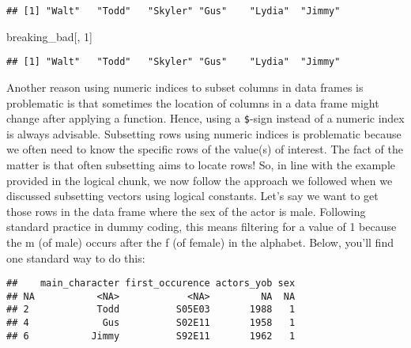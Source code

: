 \documentclass[
]{article}
\newenvironment{Shaded}{\begin{snugshade}}{\end{snugshade}}
\newcommand{\DecValTok}[1]{\textcolor[rgb]{0.00,0.00,0.81}{#1}}
\newcommand{\NormalTok}[1]{#1}
\newcommand{\SpecialCharTok}[1]{\textcolor[rgb]{0.00,0.00,0.00}{#1}}
\begin{document}
\begin{Shaded}
\end{Shaded}

\begin{verbatim}
## [1] "Walt"   "Todd"   "Skyler" "Gus"    "Lydia"  "Jimmy"
\end{verbatim}

\begin{Shaded}
\begin{Highlighting}[]
\NormalTok{breaking\_bad[, }\DecValTok{1}\NormalTok{]}
\end{Highlighting}
\end{Shaded}

\begin{verbatim}
## [1] "Walt"   "Todd"   "Skyler" "Gus"    "Lydia"  "Jimmy"
\end{verbatim}

Another reason using numeric indices to subset columns in data frames is
problematic is that sometimes the location of columns in a data frame
might change after applying a function. Hence, using a \texttt{\$}-sign
instead of a numeric index is always advisable. Subsetting rows using
numeric indices is problematic because we often need to know the
specific rows of the value(s) of interest. The fact of the matter is
that often subsetting aims to locate rows! So, in line with the example
provided in the logical chunk, we now follow the approach we followed
when we discussed subsetting vectors using logical constants. Let's say
we want to get those rows in the data frame where the sex of the actor
is male. Following standard practice in dummy coding, this means
filtering for a value of 1 because the m (of male) occurs after the f
(of female) in the alphabet. Below, you'll find one standard way to do
this:

\begin{Shaded}
\end{Shaded}

\begin{verbatim}
##    main_character first_occurence actors_yob sex
## NA           <NA>            <NA>         NA  NA
## 2            Todd          S05E03       1988   1
## 4             Gus          S02E11       1958   1
## 6           Jimmy          S92E11       1962   1
\end{verbatim}
\end{document}
